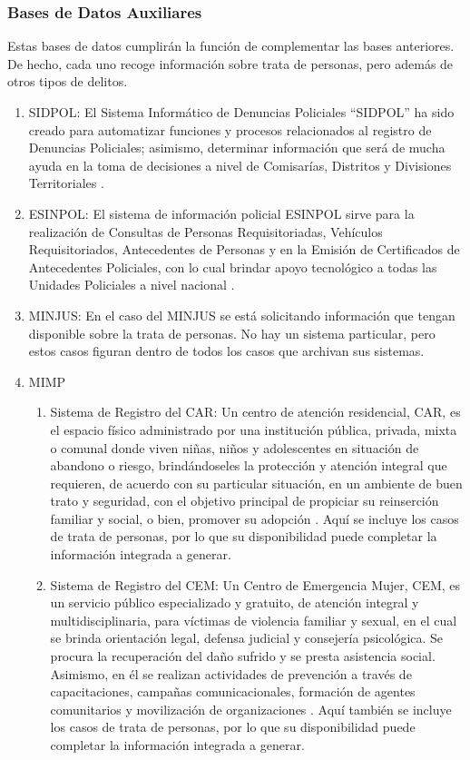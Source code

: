 \documentclass{article}
\begin{document}
\subsubsection{Bases de Datos Auxiliares}
Estas bases de datos cumplirán la función de complementar las bases anteriores. De hecho, cada uno recoge información sobre trata de personas, pero además de otros tipos de delitos. 
\begin{enumerate}
\item SIDPOL: El Sistema Informático de Denuncias Policiales “SIDPOL” ha sido creado para automatizar funciones y procesos relacionados al registro de Denuncias Policiales; asimismo, determinar información que será de mucha ayuda en la toma de decisiones a nivel de Comisarías, Distritos y Divisiones Territoriales \cite{policia_nacional_del_peru_normas_2015}. 

\item ESINPOL: El sistema de información policial ESINPOL sirve para la realización de
Consultas de Personas Requisitoriadas, Vehículos Requisitoriados, Antecedentes de Personas y en la Emisión de Certificados de Antecedentes Policiales, con lo cual brindar apoyo tecnológico a todas las Unidades
Policiales a nivel nacional \cite{policia_nacional_del_peru_manuel_2015}. 
\item MINJUS: En el caso del MINJUS se está solicitando información que tengan disponible sobre la trata de personas. No hay un sistema particular, pero estos casos figuran dentro de todos los casos que archivan sus sistemas.
\item MIMP
  \begin{enumerate}
  \item Sistema de Registro del CAR: Un centro de atención residencial, CAR, es el espacio físico administrado por una institución pública, privada, mixta o comunal donde viven niñas, niños y adolescentes en situación de abandono o riesgo, brindándoseles la protección y atención integral que requieren, de acuerdo con su particular situación, en un ambiente de buen trato y seguridad, con el objetivo principal de propiciar su reinserción familiar y social, o bien, promover su adopción \cite{capital_humano_y_social_alternativo_guipara_2016}. Aquí se incluye los casos de trata de personas, por lo que su disponibilidad puede completar la información integrada a generar.
  \item Sistema de Registro del CEM: Un Centro de Emergencia Mujer, CEM, es un servicio público especializado y gratuito, de atención integral y multidisciplinaria, para víctimas de violencia familiar y sexual, en el cual se brinda orientación legal, defensa judicial y consejería psicológica. Se procura la recuperación del daño sufrido y se presta asistencia social. Asimismo, en él se realizan actividades de prevención a través de capacitaciones, campañas comunicacionales, formación de agentes comunitarios y movilización de organizaciones \cite{viviano_que_2014}. Aquí también se incluye los casos de trata de personas, por lo que su disponibilidad puede completar la información integrada a generar.
  \end{enumerate}

\end{enumerate}
\end{document}
